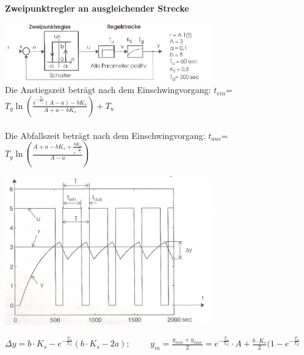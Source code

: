 	\vspace{.5cm}
		\textbf{Zweipunktregler an ausgleichender Strecke } \\
		\begin{minipage}{9cm}
 		\includegraphics[width=9cm]{./bilder/ZweipunktreglerTotglied2.jpg}\\
			Die Anstiegszeit beträgt nach dem Einschwingvorgang:
			$t_{ein}$=$T_g\ln(\frac{e^{-\frac{T_u}{T_g}}(A-a)-b K_s}{A+a-b K_s})+T_u$\\ \\
			Die Abfallszeit beträgt nach dem Einschwingvorgang:
			$t_{aus}$=$T_g\ln(\frac{A+a-b
			K_s+\frac{b K_s}{e^{-\frac{T_u}{T_g}}}}{A-a})$\\
        \end{minipage}
		\begin{minipage}{9cm}
		\includegraphics[width=9cm]{./bilder/ZweipunktreglerTotglied_dia.jpg}			
        \end{minipage}
    
 	$\Delta y = b\cdot K_s - e^{-\frac{T_u}{T_G}}(b\cdot K_s - 2a); \qquad$
	$y_m = \frac{y_{min}+y_{max}}{2}=e^{-\frac{T_u}{T_G}}\cdot A + \frac{b\cdot K_s}{2}(1-e^{-\frac{T_u}{T_G}}$

